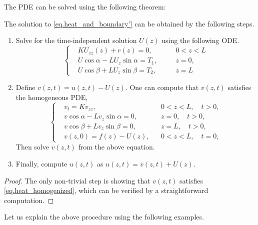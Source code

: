 The PDE can be solved using the following theorem:
\begin{theorem}\label{th.solve_non-homogeneous_heat}
    The solution to \eqref{eq.heat_and_boundary'} can be obtained by the following steps.
    \begin{enumerate}
        \item Solve for the time-independent solution $U(z)$ using the following ODE.
        \begin{equation}\label{eq.time_independent_sol'}
        \left\{\begin{aligned} 
            &K U_{z z}(z) + r(z) = 0, && 0<z<L
            \\ 
            &U \cos \alpha-L U_z \sin \alpha=T_1,\quad && z=0, 
            \\ 
            &U \cos \beta+L U_z \sin \beta=T_2, && z=L
        \end{aligned}\right.
    \end{equation}
    \item Define $v(z, t) = u(z, t) - U(z)$. One can compute that $v(z, t)$ satisfies the homogeneous PDE,
    \begin{equation}\label{eq.heat_homogenized}
        \left\{\begin{aligned} 
            &v_t=K v_{z z}, && 0<z<L, \quad t>0, 
            \\ 
            &v \cos \alpha-L v_z \sin \alpha=0,\quad && z=0, \quad t>0, 
            \\ 
            &v \cos \beta+L v_z \sin \beta=0, && z=L, \quad t>0, 
            \\
            &v(z, 0)=f(z)-U(z), && 0<z<L, \quad t=0,
        \end{aligned}\right.
    \end{equation}
    Then solve $v(z, t)$ from the above equation.
    \item Finally, compute $u(z, t)$ as $u(z, t) = v(z, t) + U(z)$.
    \end{enumerate}
\end{theorem}
\begin{proof}
    The only non-trivial step is showing that $v(z, t)$ satisfies \eqref{eq.heat_homogenized}, which can be verified by a straightforward computation.
\end{proof}

Let us explain the above procedure using the following examples.

